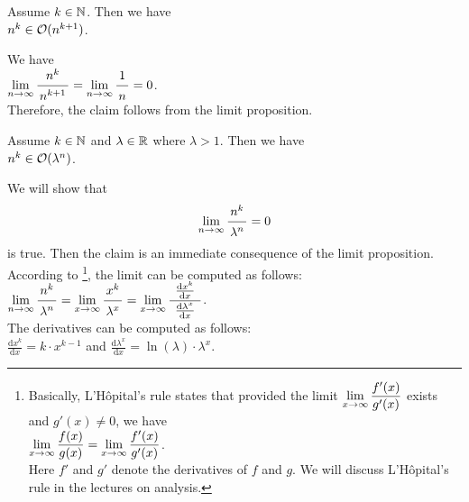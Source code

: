 \example
Assume $k \in {\mathbb N}$.  Then we have
\\[0.2cm]
\hspace*{1.3cm}
 $n^k \in \mathcal{O}(n^{k+1})$.

\proof
We have \\[0.2cm]
\hspace*{1.3cm} 
$\lim\limits_{n \rightarrow \infty} \bruch{n^{k}}{n^{k+1}} = \lim\limits_{n \rightarrow   \infty} \bruch{1}{n} = 0$.
\\[0.2cm]
Therefore, the claim follows from the limit proposition. 
\qeds

\example
Assume $k \in {\mathbb N}$ and $\lambda \in {\mathbb R}$ where $\lambda > 1$.  Then we have \\[0.2cm]
\hspace*{1.3cm} $n^k \in \mathcal{O}(\lambda^n)$.

\proof  We will show that 
\hspace*{1.3cm} 
\begin{equation}
  \label{eq:star}
  \lim\limits_{n \rightarrow \infty} \bruch{n^{k}}{\lambda^n} = 0  
\end{equation}
is true.  Then the claim is an immediate consequence of the limit proposition. 
According to \footnote{Basically, L'H\^opital's rule states that provided the
  limit $\displaystyle \lim\limits_{x \rightarrow \infty} \frac{f'(x)}{g'(x)}$ exists and $g'(x) \not= 0$, we have
\\
\hspace*{1.3cm}
$\displaystyle\lim\limits_{x \rightarrow \infty} \frac{f(x)}{g(x)} = \lim\limits_{x \rightarrow \infty} \frac{f'(x)}{g'(x)}$.
\\[0.2cm]
Here $f'$ and $g'$ denote the derivatives of $f$ and $g$. 
  We will discuss L'H\^opital's rule in the lectures on analysis.
},  
the limit can be computed as follows: \\[0.2cm]
\hspace*{1.3cm} 
$\displaystyle \lim\limits_{n \rightarrow \infty} \bruch{n^{k}}{\lambda^n} =
\lim\limits_{x \rightarrow \infty} \bruch{x^{k}}{\lambda^x} =
\lim\limits_{x \rightarrow \infty} \bruch{\;\frac{\mathrm{d}x^{k}}{\mathrm{d}x}\;}{\frac{\mathrm{d}\lambda^x}{\mathrm{d}x}}$.
\\[0.2cm]
The derivatives can be computed as follows: \\[0.2cm]
\hspace*{1.3cm}
 $\displaystyle \frac{\mathrm{d}x^{k}}{\mathrm{d}x} = k \cdot x^{k-1}$ \quad and \quad 
 $\displaystyle \frac{\mathrm{d}\lambda^{x}}{\mathrm{d}x} = \ln(\lambda) \cdot \lambda^x$. \\[0.2cm]
